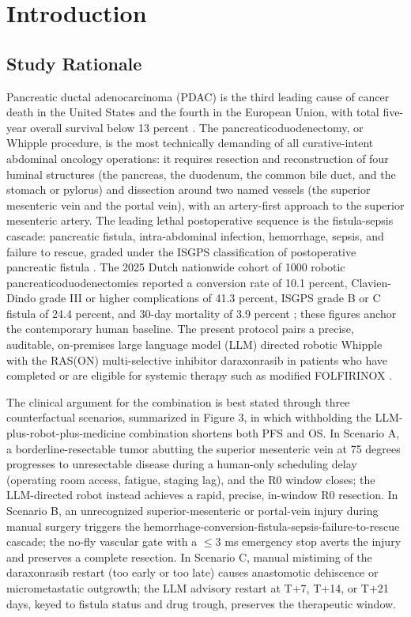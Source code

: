 \section{Introduction}

\subsection{Study Rationale}

Pancreatic ductal adenocarcinoma (PDAC) is the third leading cause of cancer
death in the United States and the fourth in the European Union, with total
five-year overall survival below 13 percent \cite{Siegel2025}. The
pancreaticoduodenectomy, or Whipple procedure, is the most technically demanding
of all curative-intent abdominal oncology operations: it requires resection and
reconstruction of four luminal structures (the pancreas, the duodenum, the common
bile duct, and the stomach or pylorus) and dissection around two named vessels
(the superior mesenteric vein and the portal vein), with an artery-first approach
to the superior mesenteric artery. The leading lethal postoperative sequence is
the fistula-sepsis cascade: pancreatic fistula, intra-abdominal infection,
hemorrhage, sepsis, and failure to rescue, graded under the ISGPS classification
of postoperative pancreatic fistula \cite{Bassi2017}. The 2025 Dutch nationwide
cohort of 1000 robotic pancreaticoduodenectomies reported a conversion rate of
10.1 percent, Clavien-Dindo grade III or higher complications of 41.3 percent,
ISGPS grade B or C fistula of 24.4 percent, and 30-day mortality of 3.9 percent
\cite{DutchCohort2025}; these figures anchor the contemporary human baseline. The
present protocol pairs a precise, auditable, on-premises large language model
(LLM) directed robotic Whipple with the RAS(ON) multi-selective inhibitor
daraxonrasib in patients who have completed or are eligible for systemic therapy
such as modified FOLFIRINOX \cite{Conroy2018}.

The clinical argument for the combination is best stated through three
counterfactual scenarios, summarized in Figure 3, in which withholding the
LLM-plus-robot-plus-medicine combination shortens both PFS and OS. In Scenario A,
a borderline-resectable tumor abutting the superior mesenteric vein at 75 degrees
progresses to unresectable disease during a human-only scheduling delay (operating
room access, fatigue, staging lag), and the R0 window closes; the LLM-directed
robot instead achieves a rapid, precise, in-window R0 resection. In Scenario B, an
unrecognized superior-mesenteric or portal-vein injury during manual surgery
triggers the hemorrhage-conversion-fistula-sepsis-failure-to-rescue cascade; the
no-fly vascular gate with a $\leq 3$ ms emergency stop averts the injury and
preserves a complete resection. In Scenario C, manual mistiming of the
daraxonrasib restart (too early or too late) causes anastomotic dehiscence or
micrometastatic outgrowth; the LLM advisory restart at T+7, T+14, or T+21 days,
keyed to fistula status and drug trough, preserves the therapeutic window.

